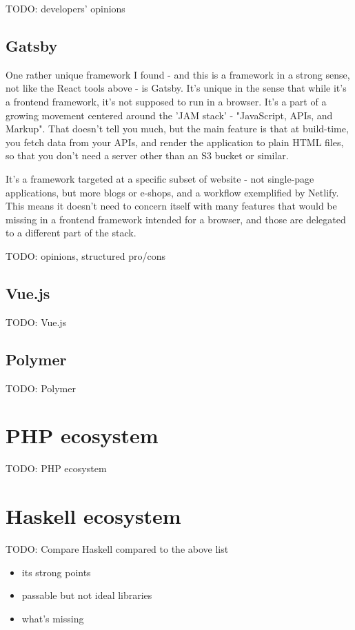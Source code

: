 \documentclass[english,odsaz]{fitthesis}
\begin{document}
TODO: developers' opinions

\subsection{Gatsby}
\label{sec:org296504a}
One rather unique framework I found - and this is a framework in a strong
sense, not like the React tools above - is Gatsby. It's unique in the sense that
while it's a frontend framework, it's not supposed to run in a browser. It's a
part of a growing movement centered around the 'JAM stack' - "JavaScript, APIs,
and Markup". That doesn't tell you much, but the main feature is that at
build-time, you fetch data from your APIs, and render the application to plain
HTML files, so that you don't need a server other than an S3 bucket or similar.

It's a framework targeted at a specific subset of website - not single-page
applications, but more blogs or e-shops, and a workflow exemplified by Netlify.
This means it doesn't need to concern itself with many features that would be
missing in a frontend framework intended for a browser, and those are delegated
to a different part of the stack.

TODO: opinions, structured pro/cons

\subsection{Vue.js}
\label{sec:org0c2f358}
TODO: Vue.js

\subsection{Polymer}
\label{sec:orgee09768}
TODO: Polymer

\section{PHP ecosystem}
\label{sec:org08d3196}
TODO: PHP ecosystem

\section{Haskell ecosystem}
\label{sec:orgac5f833}
TODO: Compare Haskell compared to the above list

\begin{itemize}
\item its strong points
\item passable but not ideal libraries
\item what's missing
\end{itemize}
\end{document}
